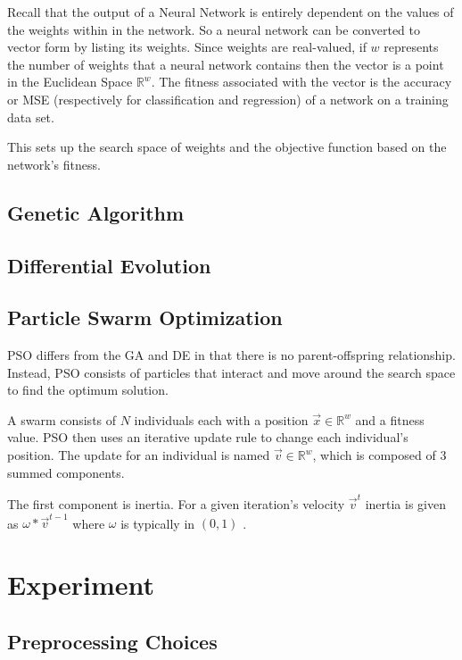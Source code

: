\documentclass[twoside,10pt]{article}
\newcommand{\Rw}{\mathbb{R}^w }
\begin{document}
	Recall that the output of a Neural Network is entirely dependent on the values of the weights within in the network. 
	So a neural network can be converted to vector form by listing its weights.
	Since weights are real-valued, if $w$ represents the number of weights that a neural network contains then the vector is a point in the Euclidean Space $\mathbb{R}^w$. 
	The fitness associated with the vector is the accuracy or MSE (respectively for classification and regression) of a network on a training data set. 
	
	This sets up the search space of weights and the objective function based on the network's fitness.

\subsection{Genetic Algorithm}

\subsection{Differential Evolution}

\subsection{Particle Swarm Optimization}

	PSO differs from the GA and DE in that there is no parent-offspring relationship. Instead, PSO consists of particles that interact and move around the search space to find the optimum solution. 
	
	A swarm consists of $N$ individuals each with a position $\vec{x} \in \Rw$ and a fitness value. 
	PSO then uses an iterative update rule to change each individual's position. The update for an individual is named $\vec{v} \in \Rw$, which is composed of 3 summed components.
	
	The first component is inertia. For a given iteration's velocity $\vec{v}^t$ inertia is given as $\omega * \vec{v}^{t-1}$ where $\omega$ is typically in $(0,1)$ \citep{empirical-pso}.

\section{Experiment}

\subsection{Preprocessing Choices}
\end{document}
